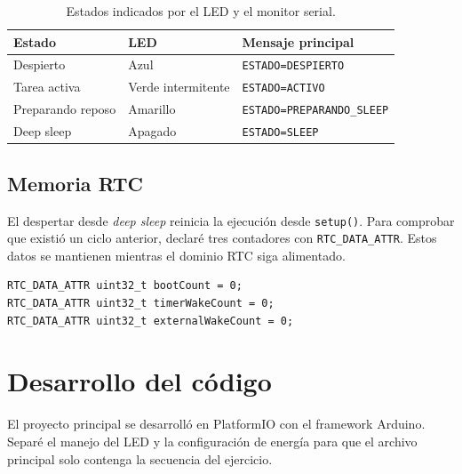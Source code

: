 \documentclass{article}
\newcommand{\tableheader}[1]{\color{tablewhite}\textbf{#1}}
\begin{document}
\begin{table}[H]
\centering
\renewcommand{\arraystretch}{1.25}
\begin{tabularx}{\linewidth}{|p{3.4cm}|p{3.4cm}|Y|}
\hline
{}\tableheader{Estado} & \tableheader{LED} & \tableheader{Mensaje principal} \\
\hline
Despierto & Azul & \texttt{ESTADO=DESPIERTO} \\
\hline
Tarea activa & Verde intermitente & \texttt{ESTADO=ACTIVO} \\
\hline
Preparando reposo & Amarillo & \texttt{ESTADO=PREPARANDO\_SLEEP} \\
\hline
Deep sleep & Apagado & \texttt{ESTADO=SLEEP} \\
\hline
\end{tabularx}
\caption{Estados indicados por el LED y el monitor serial.}
\end{table}

\subsection{Memoria RTC}

El despertar desde \textit{deep sleep} reinicia la ejecución desde \texttt{setup()}. Para comprobar que existió un ciclo anterior, declaré tres contadores con \texttt{RTC\_DATA\_ATTR}. Estos datos se mantienen mientras el dominio RTC siga alimentado.

\begin{lstlisting}
RTC_DATA_ATTR uint32_t bootCount = 0;
RTC_DATA_ATTR uint32_t timerWakeCount = 0;
RTC_DATA_ATTR uint32_t externalWakeCount = 0;
\end{lstlisting}

\section{Desarrollo del código}

El proyecto principal se desarrolló en PlatformIO con el framework Arduino. Separé el manejo del LED y la configuración de energía para que el archivo principal solo contenga la secuencia del ejercicio.
\end{document}
